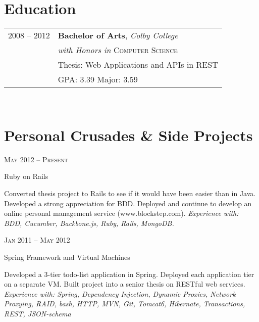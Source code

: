 \documentclass[10pt]{article} %
\begin{document}
{\begin{minipage}[t]{0.44\textwidth}

\section{Education} 


\begin{tabular}{rl} %


2008 -- \textsc{2012} & \textbf{Bachelor of Arts}, \textit{Colby College}\\ 
											& \textit{with Honors in} \textsc{Computer Science} \\
											& \footnotesize Thesis: Web Applications and APIs in REST \\
											& \small{GPA: 3.39} \small{Major: 3.59} \\
\end{tabular}\\[10pt]

\section{Personal Crusades \& Side Projects} 


{\raggedleft\textsc{May 2012 -- Present}\par}
{\raggedright\large Ruby on Rails}
{\normalsize{ Converted thesis project to Rails to see if it would have been easier than in Java. Developed a strong appreciation for BDD. Deployed and continue to develop an online personal management service (www.blockstep.com).}
\textit{Experience with: BDD, Cucumber, Backbone.js, Ruby, Rails, MongoDB. }\\[5pt]}


{\raggedleft\textsc{Jan 2011 -- May 2012}\par}
{\raggedright\large Spring Framework and Virtual Machines }
{\normalsize{ Developed a 3-tier todo-list application in Spring. Deployed each application tier on a separate VM. Built project into a senior thesis on RESTful web services. }
\textit{Experience with: Spring, Dependency Injection, Dynamic Proxies, Network Proxying, RAID, bash, HTTP, MVN, Git, Tomcat6, Hibernate, Transactions, REST, JSON-schema } \\[5pt]}


\end{minipage}}
\end{document}
